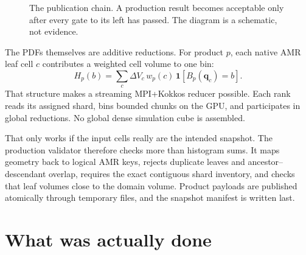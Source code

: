\documentclass[11pt]{article}
\begin{document}
\begin{figure}[ht]
\centering
{}
\caption{The publication chain. A production result becomes acceptable only
after every gate to its left has passed. The diagram is a schematic, not
evidence.}
\end{figure}

The PDFs themselves are additive reductions. For product \(p\), each native
AMR leaf cell \(c\) contributes a weighted cell volume to one bin:
\[
H_p(b)=\sum_c \Delta V_c\,w_p(c)\,
  \mathbf{1}\!\left[B_p(\boldsymbol{q}_c)=b\right].
\]
That structure makes a streaming MPI+Kokkos reducer possible. Each rank reads
its assigned shard, bins bounded chunks on the GPU, and participates in global
reductions. No global dense simulation cube is assembled.

That only works if the input cells really are the intended snapshot. The
production validator therefore checks more than histogram sums. It maps
geometry back to logical AMR keys, rejects duplicate leaves and
ancestor--descendant overlap, requires the exact contiguous shard inventory,
and checks that leaf volumes close to the domain volume. Product payloads are
published atomically through temporary  files, and the
snapshot manifest is written last.

\section{What was actually done}
\end{document}
